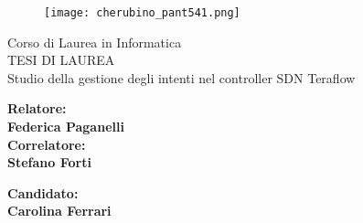 \documentclass[12pt]{report}
\begin{document}
\begin{titlepage}
\begin{figure}
    \centering\texttt{[image: cherubino\_pant541.png]}
\end{figure}

\begin{center}
    {\LARGE{ Corso di Laurea in Informatica \\}}
    \vspace{2cm}
    {\Large { TESI DI LAUREA }}\\
    \vspace{2cm}
    {\Large { Studio della gestione degli intenti nel controller SDN Teraflow }}
\end{center}

\vspace{2cm}

\begin{minipage}[t]{0.47\textwidth}
	{\large{\bf Relatore:\\ Federica Paganelli}}
	\vspace{0.5cm}
	{\large{\bf \\Correlatore:\\ Stefano Forti}}
\end{minipage}\hfill
\begin{minipage}[t]{0.47\textwidth}\raggedleft
	{\large{\bf Candidato: \\ Carolina Ferrari\\ }}
\end{minipage}

\vspace{25mm}

\end{titlepage}


\tableofcontents
\thispagestyle{empty}
\listoffigures

\thispagestyle{empty}
\clearpage
\setcounter{page}{1}



\clearpage








%

 

%
\end{document}
